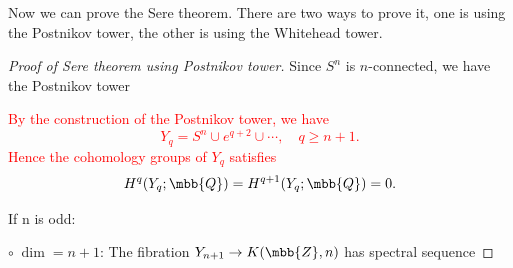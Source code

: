     Now we can prove the Sere theorem. There are two ways to prove it,
    one is using the Postnikov tower, 
    the other is using the Whitehead tower.
    \begin{proof}[Proof of Sere theorem using Postnikov tower]
        Since $S^n$ is $n$-connected, we have the Postnikov tower
        \begin{center}
        \end{center}
        \textcolor{red}{
        By the construction of the Postnikov tower, we have
        \begin{equation*}
            Y_q = S^n \cup e^{q+2} \cup \cdots,\quad q\geq n+1.
        \end{equation*}
        Hence the cohomology groups of $Y_q$ satisfies
        \begin{equation*}
            H^{q}(Y_q;\mbb{Q}) = H^{q+1}(Y_q;\mbb{Q}) = 0.
        \end{equation*}
        }

        \noindent If n is odd:
        
        \noindent$\circ\;\dim = n+1$: 
        The fibration $Y_{n+1} \to K(\mbb{Z},n)$ has spectral sequence


\end{proof}
